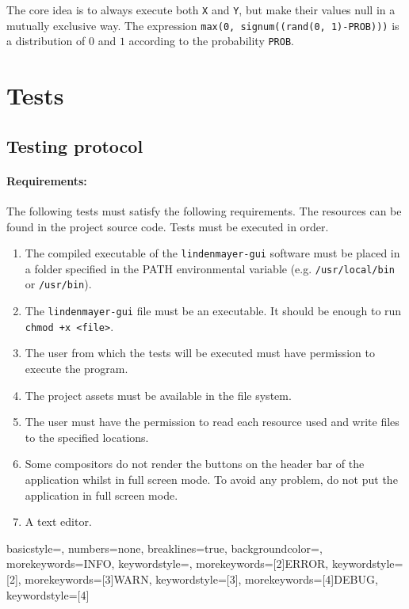 \documentclass[a4paper]{article}
\begin{document}
The core idea is to always execute both \texttt{X} and \texttt{Y}, but make their values null in a mutually exclusive way.
The expression \texttt{max(0, signum((rand(0, 1)-PROB)))} is a distribution of \(0\) and \(1\) according
to the probability \texttt{PROB}.

\pagebreak

\section{Tests}

\subsection{Testing protocol}

\paragraph{Requirements:}
The following tests must satisfy the following requirements.
The resources can be found in the project source code.
Tests must be executed in order.

\begin{enumerate}
    \item The compiled executable of the \texttt{lindenmayer-gui} software
    must be placed in a folder specified in the \textsc{PATH}
    environmental variable (e.g. \texttt{/usr/local/bin} or \texttt{/usr/bin}).
    \item The \texttt{lindenmayer-gui} file must be an executable. It should be enough to run
    \lstinline{chmod +x <file>}.
    \item The user from which the tests will be executed must have permission to execute
    the program.
    \item The project assets must be available in the file system.
    \item The user must have the permission to read each resource used and write files
    to the specified locations.
    \item Some compositors do not render the buttons on the header bar of the application whilst in full screen mode.
    To avoid any problem, do not put the application in full screen mode.
    \item A text editor.
\end{enumerate}

 {
    basicstyle=\ttfamily,
    numbers=none,
    breaklines=true,
    backgroundcolor=\color[gray]{0.97},
    morekeywords={INFO},
    keywordstyle=\color[rgb]{0, 0.75, 0},
    morekeywords=[2]{ERROR},
    keywordstyle=[2]\color[rgb]{0.75, 0, 0},
    morekeywords=[3]{WARN},
    keywordstyle=[3]\color[rgb]{1, 0.5, 0},
    morekeywords=[4]{DEBUG},
    keywordstyle=[4]\color[rgb]{0.1, 0.1, 0.9}
}
\end{document}
